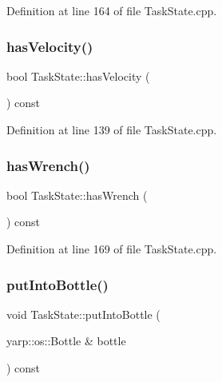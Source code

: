 Definition at line 164 of file Task\+State.\+cpp.

\hypertarget{classocra_1_1TaskState_acbadab55cd6c9d68bd328139f6265f8a}{}\label{classocra_1_1TaskState_acbadab55cd6c9d68bd328139f6265f8a} 
\subsubsection{\texorpdfstring{has\+Velocity()}{hasVelocity()}}
{\footnotesize\ttfamily bool Task\+State\+::has\+Velocity (\begin{DoxyParamCaption}{ }\end{DoxyParamCaption}) const}



Definition at line 139 of file Task\+State.\+cpp.

\hypertarget{classocra_1_1TaskState_a9f51de95fd8731458ea9e111924d5211}{}\label{classocra_1_1TaskState_a9f51de95fd8731458ea9e111924d5211} 
\subsubsection{\texorpdfstring{has\+Wrench()}{hasWrench()}}
{\footnotesize\ttfamily bool Task\+State\+::has\+Wrench (\begin{DoxyParamCaption}{ }\end{DoxyParamCaption}) const}



Definition at line 169 of file Task\+State.\+cpp.

\hypertarget{classocra_1_1TaskState_aaf49d858337f9dee73b22eefc367fd35}{}\label{classocra_1_1TaskState_aaf49d858337f9dee73b22eefc367fd35} 
\subsubsection{\texorpdfstring{put\+Into\+Bottle()}{putIntoBottle()}}
{\footnotesize\ttfamily void Task\+State\+::put\+Into\+Bottle (\begin{DoxyParamCaption}\item[{yarp\+::os\+::\+Bottle \&}]{bottle }\end{DoxyParamCaption}) const}




